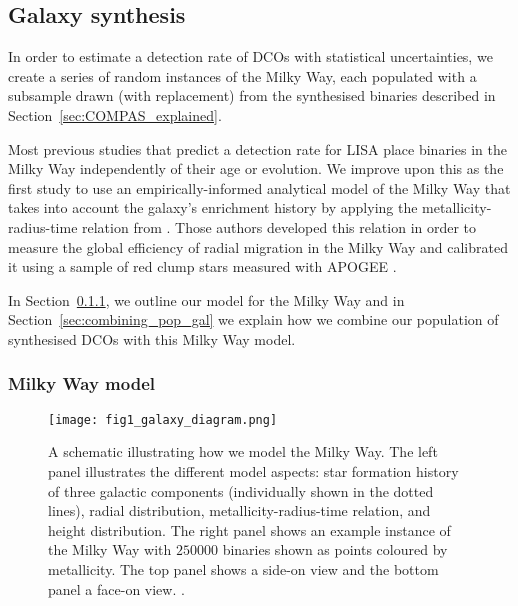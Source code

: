 \subsection{Galaxy synthesis}\label{sec:galaxy_synthesis}

In order to estimate a detection rate of DCOs with statistical uncertainties, we create a series of random instances of the Milky Way, each populated with a subsample drawn (with replacement) from the synthesised binaries described in Section~\ref{sec:COMPAS_explained}.

Most previous studies that predict a detection rate for LISA place binaries in the Milky Way independently of their age or evolution. We improve upon this as the first study to use an empirically-informed analytical model of the Milky Way that takes into account the galaxy's enrichment history by applying the metallicity-radius-time relation from \citet{Frankel+2018}. Those authors developed this relation in order to measure the global efficiency of radial migration in the Milky Way and calibrated it using a sample of red clump stars measured with APOGEE \citep{Majewski+2017}.

In Section~\ref{sec:mw_model}, we outline our model for the Milky Way and in Section~\ref{sec:combining_pop_gal} we explain how we combine our population of synthesised DCOs with this Milky Way model.

\subsubsection{Milky Way model}\label{sec:mw_model}

\begin{figure*}[t]
    \centering
    \texttt{[image: fig1\_galaxy\_diagram.png]}
    \caption{A schematic illustrating how we model the Milky Way. The left panel illustrates the different model aspects: star formation history of three galactic components (individually shown in the dotted lines), radial distribution, metallicity-radius-time relation, and height distribution. The right panel shows an example instance of the Milky Way with $250000$ binaries shown as points coloured by metallicity. The top panel shows a side-on view and the bottom panel a face-on view. \href{https://github.com/TomWagg/detecting-DCOs-in-LISA/blob/main/paper/figures/fig1_galaxy_diagram.png}{\faFileImage} \href{https://github.com/TomWagg/detecting-DCOs-in-LISA/blob/main/paper/figure_notebooks/galaxy_creation_station.ipynb}{\faBook}.}
    \label{fig:galaxy_schematic}
\end{figure*}

